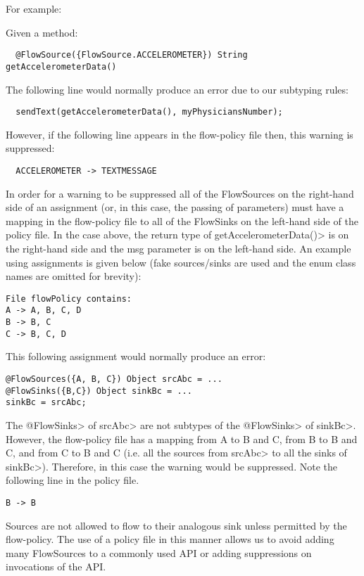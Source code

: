 For example:

Given a method:
\begin{Verbatim}
  @FlowSource({FlowSource.ACCELEROMETER}) String getAccelerometerData()
\end{Verbatim}

The following line would normally produce an error due to our subtyping rules:
\begin{Verbatim}
  sendText(getAccelerometerData(), myPhysiciansNumber);
\end{Verbatim}

However, if the following line appears in the flow-policy file then, this warning is suppressed:
\begin{Verbatim}
  ACCELEROMETER -> TEXTMESSAGE
\end{Verbatim}

In order for a warning to be suppressed all of the FlowSources
on the right-hand side of an assignment (or, in this case, the
passing of parameters) must have a mapping in the flow-policy
file to all of the FlowSinks on the left-hand side of the policy
file.  In the case above, the return type of
\<getAccelerometerData()> is on the right-hand side and the
msg parameter is on the left-hand side.  An example using
assignments is given below  (fake sources/sinks are used and the
enum class names are omitted for brevity):

\begin{Verbatim}
File flowPolicy contains:
A -> A, B, C, D
B -> B, C
C -> B, C, D
\end{Verbatim}

This following assignment would normally produce an error:
\begin{Verbatim}
@FlowSources({A, B, C}) Object srcAbc = ...
@FlowSinks({B,C}) Object sinkBc = ...
sinkBc = srcAbc;
\end{Verbatim}

 The \<@FlowSinks> of \<srcAbc> are not subtypes of the
\<@FlowSinks> of \<sinkBc>.  However, the flow-policy file has a
mapping from A to B and C, from B to B and C, and from C to B
and C (i.e. all the sources from \<srcAbc> to all the sinks of
\<sinkBc>).   Therefore, in this case the warning would be
suppressed.  Note the following line in the policy file.
\begin{Verbatim}
B -> B
\end{Verbatim}

Sources are not allowed to flow to their analogous sink unless
permitted by the flow-policy.  The use of a policy file in
this manner allows us to avoid adding many FlowSources to a
commonly used API or adding suppressions on invocations of
the API.

